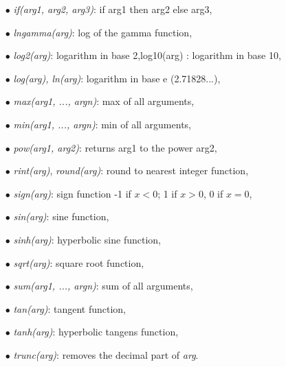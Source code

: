 \begin{itemize}
\item[$\bullet$] \textit{if(arg1, arg2, arg3)}:  if arg1 then arg2 else arg3,
\item[$\bullet$] \textit{lngamma(arg)}:  log of the gamma function,
\item[$\bullet$] \textit{log2(arg)}:  logarithm in base 2,log10(arg) :  logarithm in base 10,
\item[$\bullet$] \textit{log(arg), ln(arg)}:  logarithm in base e (2.71828...),
\item[$\bullet$] \textit{max(arg1, ..., argn)}:  max of all arguments,
\item[$\bullet$] \textit{min(arg1, ..., argn)}:  min of all arguments,
\item[$\bullet$] \textit{pow(arg1, arg2)}: returns arg1 to the power arg2,
\item[$\bullet$] \textit{rint(arg)}, \textit{round(arg)}:  round to nearest integer function,
\item[$\bullet$] \textit{sign(arg)}:  sign function -1 if $x< 0$; 1 if $x>0$, 0 if $x=0$,
\item[$\bullet$] \textit{sin(arg)}:  sine function,
\item[$\bullet$] \textit{sinh(arg)}:  hyperbolic sine function,
\item[$\bullet$] \textit{sqrt(arg)}:  square root function,
\item[$\bullet$] \textit{sum(arg1, ..., argn)}:  sum of all arguments,
\item[$\bullet$] \textit{tan(arg)}:  tangent function,
\item[$\bullet$] \textit{tanh(arg)}:  hyperbolic tangens function,
\item[$\bullet$] \textit{trunc(arg)}:  removes the decimal part of \textit{arg}.
\end{itemize}

